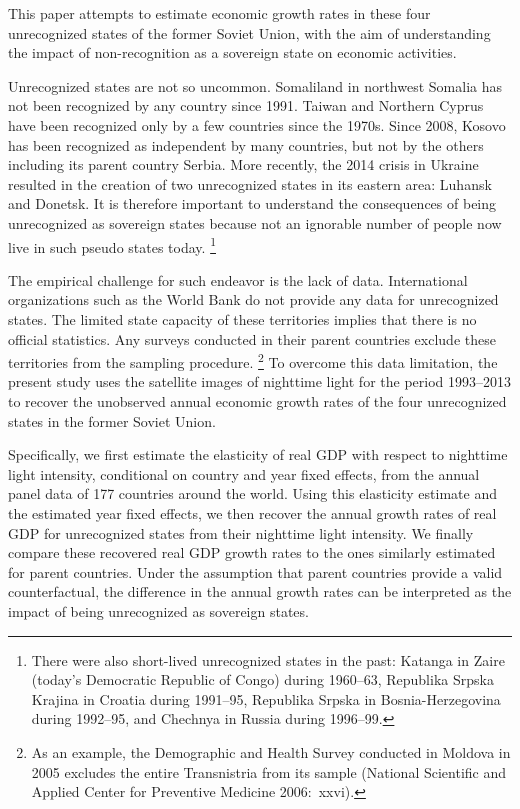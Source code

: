 \documentclass[12pt,a4paper]{article}%
\begin{document}
This paper attempts to estimate economic growth rates in these four unrecognized states of the former Soviet Union, with the aim of understanding the impact of non-recognition as a sovereign state on economic activities. 

Unrecognized states are not so uncommon. 
Somaliland in northwest Somalia has not been recognized by any country since 1991. 
Taiwan and Northern Cyprus have been recognized only by a few countries since the 1970s. 
Since 2008, Kosovo has been recognized as independent by many countries, but not by the others including its parent country Serbia.
More recently, the 2014 crisis in Ukraine resulted in the creation of two unrecognized states in its eastern area: Luhansk and Donetsk.
It is therefore important to understand the consequences of being unrecognized as sovereign states because not an ignorable number of people now live in such pseudo states today.%
\footnote{
	There were also short-lived unrecognized states in the past: Katanga in Zaire (today's Democratic Republic of Congo) during 1960--63, Republika Srpska Krajina in Croatia during 1991--95, Republika Srpska in Bosnia-Herzegovina during 1992--95, and Chechnya in Russia during 1996--99.
	}

The empirical challenge for such endeavor is the lack of data. International organizations such as the World Bank do not provide any data for unrecognized states. 
The limited state capacity of these territories implies that there is no official statistics. 
Any surveys conducted in their parent countries exclude these territories from the sampling procedure.%
\footnote{%
	As an example, the Demographic and Health Survey conducted in Moldova in 2005 excludes the entire Transnistria from its sample (National Scientific and Applied Center for Preventive Medicine 2006:\ xxvi).
} 
To overcome this data limitation, the present study uses the satellite images of nighttime light for the period 1993--2013 to recover the unobserved annual economic growth rates of the four unrecognized states in the former Soviet Union.

Specifically, we first estimate the elasticity of real GDP with respect to nighttime light intensity, conditional on country and year fixed effects, from the annual panel data of 177 countries around the world. 
Using this elasticity estimate and the estimated year fixed effects, we then recover the annual growth rates of real GDP for unrecognized states from their nighttime light intensity. 
We finally compare these recovered real GDP growth rates to the ones similarly estimated for parent countries. 
Under the assumption that parent countries provide a valid counterfactual, the difference in the annual growth rates can be interpreted as the impact of being unrecognized as sovereign states. 
\end{document}
